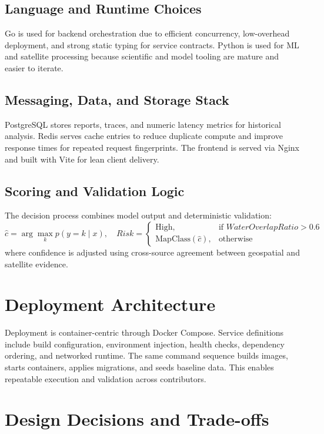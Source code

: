 \documentclass[conference]{IEEEtran}
\begin{document}
\subsection{Language and Runtime Choices}
Go is used for backend orchestration due to efficient concurrency, low-overhead deployment, and strong static typing for service contracts. Python is used for ML and satellite processing because scientific and model tooling are mature and easier to iterate.

\subsection{Messaging, Data, and Storage Stack}
PostgreSQL stores reports, traces, and numeric latency metrics for historical analysis. Redis serves cache entries to reduce duplicate compute and improve response times for repeated request fingerprints. The frontend is served via Nginx and built with Vite for lean client delivery.

\subsection{Scoring and Validation Logic}
The decision process combines model output and deterministic validation:
\begin{equation}
\hat{c} = \arg\max_{k} p(y=k\mid x), \quad
Risk =
\begin{cases}
\text{High}, & \text{if } WaterOverlapRatio > 0.6 \\
\text{MapClass}(\hat{c}), & \text{otherwise}
\end{cases}
\end{equation}
where confidence is adjusted using cross-source agreement between geospatial and satellite evidence.

\section{Deployment Architecture}
Deployment is container-centric through Docker Compose. Service definitions include build configuration, environment injection, health checks, dependency ordering, and networked runtime. The same command sequence builds images, starts containers, applies migrations, and seeds baseline data. This enables repeatable execution and validation across contributors.

\section{Design Decisions and Trade-offs}
\end{document}
